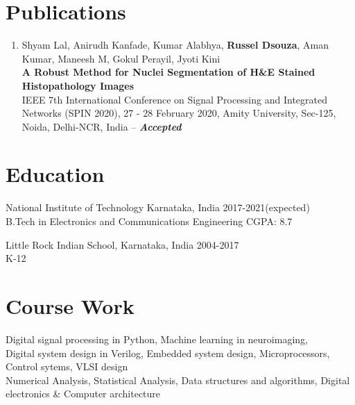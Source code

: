 \documentclass[letterpaper]{article}
\renewenvironment{itemize}{
  \begin{list}{}{
    \setlength{\leftmargin}{1.5em}
  }
}{
  \end{list}
}
\newcommand{\smallGreyFont}[1]{\textcolor{black!80}{\small{#1}}}
\begin{document}
\section*{Publications}
  \begin{enumerate}
    \item Shyam Lal, Anirudh Kanfade, Kumar Alabhya, \textbf{Russel Dsouza}, Aman Kumar, Maneesh M, Gokul Perayil, Jyoti Kini \\
    \textbf{A Robust Method for Nuclei Segmentation of H\&E Stained Histopathology Images}\\
    IEEE 7th International Conference on Signal Processing and Integrated Networks (SPIN 2020), 27 - 28 February 2020, Amity University, Sec-125, Noida, Delhi-NCR, India -- \textit{\textbf{Accepted}}

  \end{enumerate}

\section*{Education}
  \begin{itemize}
    \item National Institute of Technology Karnataka, India\hfill
    \smallGreyFont{2017-2021(expected)} \\
    \smallGreyFont{B.Tech in Electronics and Communications Engineering}
    \hfill{\smallGreyFont{CGPA: 8.7}}

    \item Little Rock Indian School, Karnataka, India\hfill
    \smallGreyFont{2004-2017} \\
    \smallGreyFont{K-12}
  \end{itemize}

\section*{Course Work}
  \begin{itemize}
    \item  Digital signal processing in Python, Machine learning in neuroimaging, \\
    Digital system design in Verilog, Embedded system design,
    Microprocessors, Control sytems, VLSI design \\
    Numerical Analysis, Statistical Analysis, Data structures and algorithms, Digital electronics \& Computer architecture
  \end{itemize}
\end{document}
